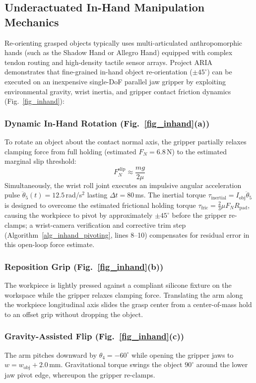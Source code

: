 \documentclass[journal]{IEEEtran}
\begin{document}
\subsection{Underactuated In-Hand Manipulation Mechanics}
Re-orienting grasped objects typically uses multi-articulated anthropomorphic hands (such as the Shadow Hand or Allegro Hand) equipped with complex tendon routing and high-density tactile sensor arrays. Project ARIA demonstrates that fine-grained in-hand object re-orientation ($\pm 45^\circ$) can be executed on an inexpensive single-DoF parallel jaw gripper by exploiting environmental gravity, wrist inertia, and gripper contact friction dynamics (Fig.~\ref{fig_inhand}):

\subsubsection{Dynamic In-Hand Rotation (Fig.~\ref{fig_inhand}(a))}
To rotate an object about the contact normal axis, the gripper partially relaxes clamping force from full holding (estimated $F_N = 6.8$\,N) to the estimated marginal slip threshold:
\begin{equation}
F_N^{\text{slip}} \approx \frac{m g}{2 \mu}
\end{equation}
Simultaneously, the wrist roll joint executes an impulsive angular acceleration pulse $\ddot{\theta}_5(t) = 12.5$\,rad/s$^2$ lasting $\Delta t = 80$\,ms. The inertial torque $\tau_{\text{inertial}} = I_{\text{obj}} \ddot{\theta}_5$ is designed to overcome the estimated frictional holding torque $\tau_{\text{fric}} = \frac{2}{3} \mu F_N R_{\text{pad}}$, causing the workpiece to pivot by approximately $\pm 45^\circ$ before the gripper re-clamps; a wrist-camera verification and corrective trim step (Algorithm~\ref{alg_inhand_pivoting}, lines 8--10) compensates for residual error in this open-loop force estimate.

\subsubsection{Reposition Grip (Fig.~\ref{fig_inhand}(b))}
The workpiece is lightly pressed against a compliant silicone fixture on the workspace while the gripper relaxes clamping force. Translating the arm along the workpiece longitudinal axis slides the grasp center from a center-of-mass hold to an offset grip without dropping the object.

\subsubsection{Gravity-Assisted Flip (Fig.~\ref{fig_inhand}(c))}
The arm pitches downward by $\theta_4 = -60^\circ$ while opening the gripper jaws to $w = w_{\text{obj}} + 2.0$\,mm. Gravitational torque swings the object $90^\circ$ around the lower jaw pivot edge, whereupon the gripper re-clamps.
\end{document}
